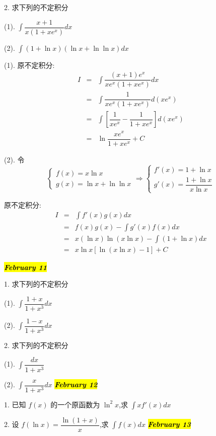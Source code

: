 2. 求下列的不定积分

(1). $\int \dfrac{x+1}{x(1+xe^{x})}dx$

(2). $\int (1+\ln x)(\ln x+\ln\ln x)dx$
\begin{solution}

	(1). 原不定积分:
	\begin{eqnarray*}
		I & = & \int \dfrac{(x+1)e^{x}}{xe^{x}(1+xe^{x})}dx\\
		  & = & \int \dfrac{1}{xe^{x}(1+xe^{x})}d(xe^{x})\\
		  & = & \int \left[\dfrac{1}{xe^{x}}-\dfrac{1}{1+xe^{x}}\right]d(xe^{x})\\
		  & = & \ln \dfrac{xe^{x}}{1+xe^{x}} +C
	\end{eqnarray*}

	(2). 令 
	$$\begin{cases}
		f(x) = x\ln x \\ 
		g(x) = \ln x+\ln \ln x
	\end{cases}\Rightarrow 
	\begin{cases} 
		f'(x) = 1+\ln x\\
		g'(x) = \dfrac{1+\ln x}{x\ln x}
	\end{cases}$$
	
	原不定积分:
	\begin{eqnarray*}
		I & = & \int f'(x)g(x)dx\\
		  & = & f(x)g(x) - \int g'(x)f(x)dx\\
		  & = & x(\ln x)\ln(x\ln x) - \int (1+\ln x)dx\\
		  & = & x\ln x\left[\ln(x\ln x) - 1 \right] + C
	\end{eqnarray*}
\end{solution}

\hl{\textbf{\textit{February 11}}}

1. 求下列的不定积分

(1). $\int \dfrac{1+x}{1+x^{3}}dx$

(2). $\int \dfrac{1-x}{1+x^{3}}dx$

2. 求下列的不定积分

(1). $\int \dfrac{dx}{1+x^{3}}$

(2). $\int \dfrac{x}{1+x^{3}}dx$
\hl{\textbf{\textit{February 12}}}

1. 已知 $f(x)$ 的一个原函数为 $\ln^{2}x$,求 $\int xf'(x)dx$

2. 设 $f(\ln x)=\dfrac{\ln(1+x)}{x}$,求 $\int f(x)dx$
\hl{\textbf{\textit{February 13}}}

